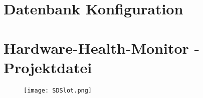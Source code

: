 \appendix
\let\stdsection\section
\renewcommand\section{\newpage\stdsection}
\renewcommand{\thesection}{\Alph{section}}
\renewcommand*{\sectionmark}[1]{\markright{\MakeMarkcase{Anhang \thesection: #1}}}








\section{Datenbank Konfiguration}\label{app:dbKonfiguration}


\section{Hardware-Health-Monitor - Projektdatei}
\begin{center}
  \begin{figure}[h!]
      \captionsetup{justification=centering,format=plain, font=small}
      \centering
      \texttt{[image: SDSlot.png]}
  \end{figure}
\end{center}